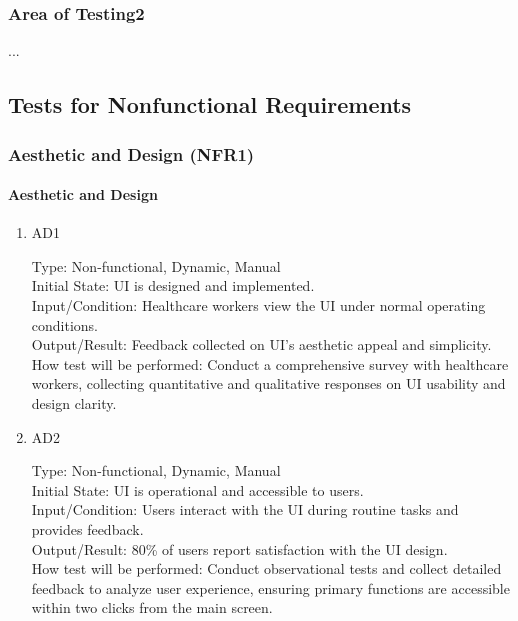 \documentclass[12pt, titlepage]{article}
\begin{document}
\subsubsection{Area of Testing2}

...

\subsection{Tests for Nonfunctional Requirements}

\subsubsection{Aesthetic and Design (NFR1)}
		
\paragraph{Aesthetic and Design}

\begin{enumerate}
    \item{AD1\\}
    
    Type: Non-functional, Dynamic, Manual\\
    
    Initial State: UI is designed and implemented.\\
    
    Input/Condition: Healthcare workers view the UI under normal operating conditions.\\
    
    Output/Result: Feedback collected on UI’s aesthetic appeal and simplicity.\\
    
    How test will be performed: Conduct a comprehensive survey with healthcare workers, collecting quantitative and qualitative responses on UI usability and design clarity.

    \item{AD2\\}
    
    Type: Non-functional, Dynamic, Manual\\
    
    Initial State: UI is operational and accessible to users.\\
    
    Input/Condition: Users interact with the UI during routine tasks and provides feedback.\\
    
    Output/Result: 80\% of users report satisfaction with the UI design.\\
    
    How test will be performed: Conduct observational tests and collect detailed feedback to analyze user experience, ensuring primary functions are accessible within two clicks from the main screen. 
\end{enumerate}
\end{document}
